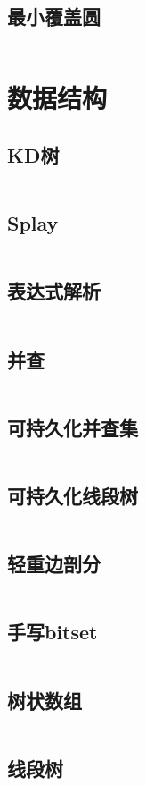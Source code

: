 \documentclass[UTF8]{ctexart}
\begin{document}
\subsection{最小覆盖圆}
\inputminted{cpp}{calcgeometry/最小覆盖圆.cpp}
\section{数据结构}
\subsection{KD树}
\inputminted{cpp}{datastructure/KD树.cpp}
\subsection{Splay}
\inputminted{cpp}{datastructure/Splay.cpp}
\subsection{表达式解析}
\inputminted{cpp}{datastructure/表达式解析.cpp}
\subsection{并查}
\inputminted{cpp}{datastructure/并查.cpp}
\subsection{可持久化并查集}
\inputminted{cpp}{datastructure/可持久化并查集.cpp}
\subsection{可持久化线段树}
\inputminted{cpp}{datastructure/可持久化线段树.cpp}
\subsection{轻重边剖分}
\inputminted{cpp}{datastructure/轻重边剖分.cpp}
\subsection{手写bitset}
\inputminted{cpp}{datastructure/手写bitset.cpp}
\subsection{树状数组}
\inputminted{cpp}{datastructure/树状数组.cpp}
\subsection{线段树}
\inputminted{cpp}{datastructure/线段树.cpp}
\end{document}
